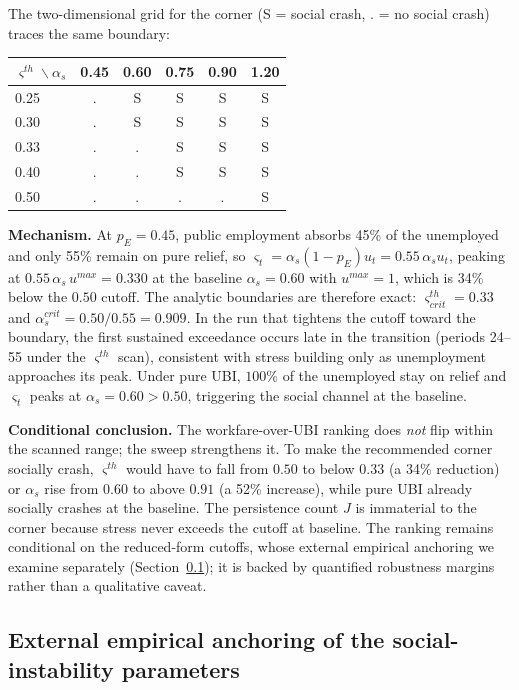 \documentclass[review,12pt]{elsarticle}
\theoremstyle{plain}
\theoremstyle{definition}
\theoremstyle{remark}
\begin{document}
\noindent The two-dimensional grid for the corner (S = social crash, . = no social crash) traces the same boundary:
\begin{center}\small
\begin{tabular}{@{}l|ccccc@{}}
\toprule
$\varsigma^{th}\backslash\alpha_s$ & 0.45 & 0.60 & 0.75 & 0.90 & 1.20 \\
\midrule
0.25 & . & S & S & S & S \\
0.30 & . & S & S & S & S \\
0.33 & . & . & S & S & S \\
0.40 & . & . & S & S & S \\
0.50 & . & . & . & . & S \\
\bottomrule
\end{tabular}
\end{center}

\noindent\textbf{Mechanism.} At $p_E=0.45$, public employment absorbs 45\% of the unemployed and only 55\% remain on pure relief, so $\varsigma_t=\alpha_s(1-p_E)u_t=0.55\,\alpha_s u_t$, peaking at $0.55\,\alpha_s\,u^{max}=0.330$ at the baseline $\alpha_s=0.60$ with $u^{max}=1$, which is 34\% below the $0.50$ cutoff. The analytic boundaries are therefore exact: $\varsigma^{th}_{crit}=0.33$ and $\alpha_s^{crit}=0.50/0.55=0.909$. In the run that tightens the cutoff toward the boundary, the first sustained exceedance occurs late in the transition (periods 24--55 under the $\varsigma^{th}$ scan), consistent with stress building only as unemployment approaches its peak. Under pure UBI, $100\%$ of the unemployed stay on relief and $\varsigma_t$ peaks at $\alpha_s=0.60>0.50$, triggering the social channel at the baseline.

\noindent\textbf{Conditional conclusion.} The workfare-over-UBI ranking does \emph{not} flip within the scanned range; the sweep strengthens it. To make the recommended corner socially crash, $\varsigma^{th}$ would have to fall from $0.50$ to below $0.33$ (a 34\% reduction) or $\alpha_s$ rise from $0.60$ to above $0.91$ (a 52\% increase), while pure UBI already socially crashes at the baseline. The persistence count $J$ is immaterial to the corner because stress never exceeds the cutoff at baseline. The ranking remains conditional on the reduced-form cutoffs, whose external empirical anchoring we examine separately (Section~\ref{sec:social-anchor}); it is backed by quantified robustness margins rather than a qualitative caveat.

\subsection{External empirical anchoring of the social-instability parameters}
\label{sec:social-anchor}
\end{document}
